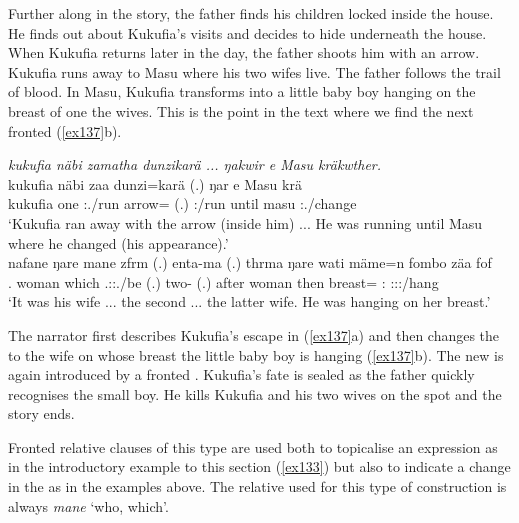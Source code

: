 Further along in the story, the father finds his children locked inside the house. He finds out about Kukufia's visits and decides to hide underneath the house. When Kukufia returns later in the day, the father shoots him with an arrow. Kukufia runs away to Masu where his two wifes live. The father follows the trail of blood. In Masu, Kukufia transforms into a little baby boy hanging on the breast of one the wives. This is the point in the text where we find the next fronted  (\ref{ex137}b).

\begin{exe}
	\ex \label{ex137}
	\begin{xlist}
	\ex
	\emph{kukufia näbi zamatha dunzikarä ... ŋakwir e Masu kräkwther.}\\
	\gll kukufia näbi zaa dunzi=karä (.) ŋar e Masu krä\\
	kukufia one \Tsg:\Pst.\Pfv/run arrow=\Prop{} (.) \Tsg:\Nonpast/run until masu \Tsg:\Irr.\Pfv/change \\
	\trans `Kukufia ran away with the arrow (inside him) ... He was running until Masu where he changed (his appearance).'
	\\
	\gll nafane ŋare mane zfrm (.) enta-ma (.) thrma ŋare wati mäme=n fombo zäa fof\\
	\Tsg.\Poss{} woman which \Tsg.\F:\Sbj:\Pst.\Dur/be (.) two-\Char{} (.) after woman then breast=\Loc{} \Dist:\All{} \Stsg:\Sbj:\Pst:\Pfv/hang \Emph{}\\
	\trans `It was his wife ... the second ... the latter wife. He was hanging on her breast.'
	\end{xlist}
\end{exe}

The narrator first describes Kukufia's escape in (\ref{ex137}a) and then changes the  to the wife on whose breast the little baby boy is hanging (\ref{ex137}b). The new  is again introduced by a fronted . Kukufia's fate is sealed as the father quickly recognises the small boy. He kills Kukufia and his two wives on the spot and the story ends.%

Fronted relative clauses of this type are used both to topicalise an expression as in the introductory example to this section (\ref{ex133}) but also to indicate a change in the  as in the examples above. The relative  used for this type of construction is always \emph{mane} `who, which'.

